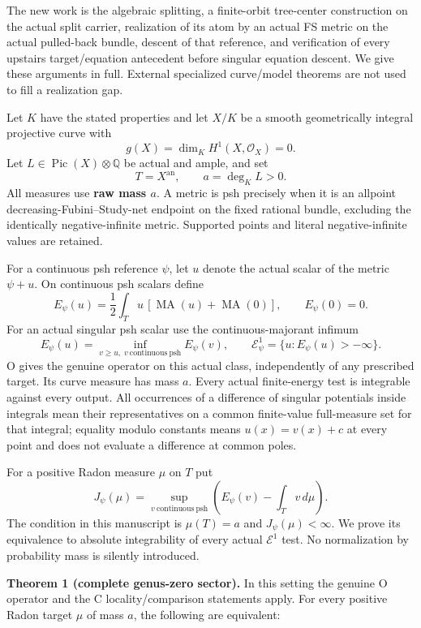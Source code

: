 \documentclass[
  11pt,
]{article}
\begin{document}
The new work is the algebraic splitting, a finite-orbit tree-center
construction on the actual split carrier, realization of its atom by an
actual FS metric on the actual pulled-back bundle, descent of that
reference, and verification of every upstairs target/equation antecedent
before singular equation descent. We give these arguments in full.
External specialized curve/model theorems are not used to fill a
realization gap.

Let \(K\) have the stated properties and let \(X/K\) be a smooth
geometrically integral projective curve with \[
g(X)=\dim_K H^1(X,\mathcal O_X)=0.
\] Let \(L\in\operatorname{Pic}(X)\otimes\mathbb Q\) be actual and
ample, and set \[
T=X^{\mathrm{an}},\qquad a=\deg_K L>0.
\] All measures use \textbf{raw mass \(a\)}. A metric is psh precisely
when it is an allpoint decreasing-Fubini--Study-net endpoint on the
fixed rational bundle, excluding the identically negative-infinite
metric. Supported points and literal negative-infinite values are
retained.

For a continuous psh reference \(\psi\), let \(u\) denote the actual
scalar of the metric \(\psi+u\). On continuous psh scalars define \[
E_\psi(u)=\frac12\int_T u\,[\operatorname{MA}(u)+\operatorname{MA}(0)],
\qquad E_\psi(0)=0.
\tag{1}
\] For an actual singular psh scalar use the continuous-majorant infimum
\[
E_\psi(u)=\inf_{v\geq u,\;v\ \mathrm{continuous\ psh}}E_\psi(v),
\qquad \mathcal E^1_\psi=\{u:E_\psi(u)>-\infty\}.
\tag{2}
\] O gives the genuine operator on this actual class, independently of
any prescribed target. Its curve measure has mass \(a\). Every actual
finite-energy test is integrable against every output. All occurrences
of a difference of singular potentials inside integrals mean their
representatives on a common finite-value full-measure set for that
integral; equality modulo constants means \(u(x)=v(x)+c\) at every point
and does not evaluate a difference at common poles.

For a positive Radon measure \(\mu\) on \(T\) put \[
J_\psi(\mu)=\sup_{v\ \mathrm{continuous\ psh}}
\left(E_\psi(v)-\int_T v\,d\mu\right).
\tag{3}
\] The condition in this manuscript is \(\mu(T)=a\) and
\(J_\psi(\mu)<\infty\). We prove its equivalence to absolute
integrability of every actual \(\mathcal E^1\) test. No normalization by
probability mass is silently introduced.

\textbf{Theorem 1 (complete genus-zero sector).} In this setting the
genuine O operator and the C locality/comparison statements apply. For
every positive Radon target \(\mu\) of mass \(a\), the following are
equivalent:
\end{document}
